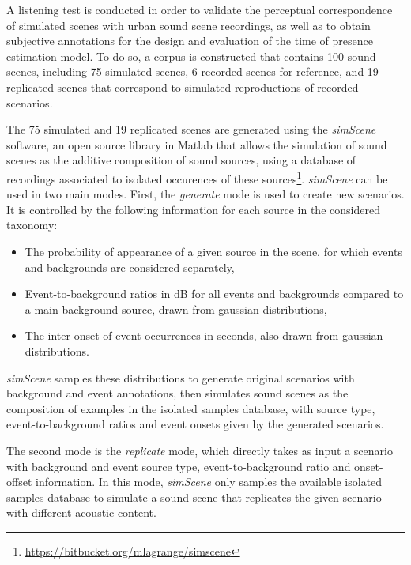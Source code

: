 \documentclass[twocolumn]{article}
\begin{document}
A listening test is conducted in order to validate the perceptual correspondence of simulated scenes with urban sound scene recordings, as well as to obtain subjective annotations for the design and evaluation of the time of presence estimation model. To do so, a corpus is constructed that contains 100 sound scenes, including 75 simulated scenes, 6 recorded scenes for reference, and 19 replicated scenes that correspond to simulated reproductions of recorded scenarios.

The 75 simulated and 19 replicated scenes are generated using the \textit{simScene} software, an open source library in Matlab that allows the simulation of sound scenes as the additive composition of sound sources, using a database of recordings associated to isolated occurences of these sources\footnote{\url{https://bitbucket.org/mlagrange/simscene}}. \textit{simScene} can be used in two main modes. First, the \textit{generate} mode is used to create new scenarios. It is controlled by the following information for each source in the considered taxonomy:

\begin{itemize}
\item The probability of appearance of a given source in the scene, for which events and backgrounds are considered separately,
\item Event-to-background ratios in dB for all events and backgrounds compared to a main background source, drawn from gaussian distributions,
\item The inter-onset of event occurrences in seconds, also drawn from gaussian distributions.
\end{itemize}

\textit{simScene} samples these distributions to generate original scenarios with background and event annotations, then simulates sound scenes as the composition of examples in the isolated samples database, with source type, event-to-background ratios and event onsets given by the generated scenarios.

The second mode is the \textit{replicate} mode, which directly takes as input a scenario with background and event source type, event-to-background ratio and onset-offset information. In this mode, \textit{simScene} only samples the available isolated samples database to simulate a sound scene that replicates the given scenario with different acoustic content.
\end{document}
